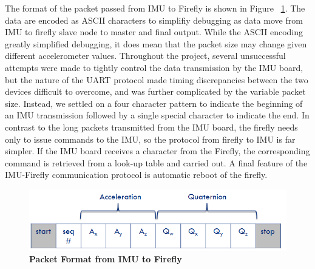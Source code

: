 \documentclass[conference]{IEEEtran}
\begin{document}
  The format of the packet passed from IMU to Firefly is shown in
Figure ~\ref{fig:packet}. The data are encoded as ASCII characters to simplifiy debugging
as data move from IMU to firefly slave node to master and final output. While the ASCII
encoding greatly simplified debugging, it does mean that the packet size may change given
different accelerometer values.  Throughout the project, several unsuccessful attempts
were made to tightly control the data transmission by the IMU board, but the nature of the
UART protocol made timing discrepancies between the two devices difficult to overcome, and
was further complicated by the variable packet size. Instead, we settled on a four
character pattern to indicate the beginning of an IMU transmission followed by a single
special character to indicate the end. In contrast to the long packets transmitted from
the IMU board, the firefly needs only to issue commands to the IMU, so the protocol from
firefly to IMU is far simpler. If the IMU board receives a character from the Firefly, the
corresponding command is retrieved from a look-up table and carried out. A final feature
of the IMU-Firefly communication protocol is automatic reboot of the firefly. 

\begin{figure}[h]
  \centering
  \includegraphics[width=0.8\columnwidth]{figs/packet}
  \caption{{\bf Packet Format from IMU to Firefly}}
  \label{fig:packet}
\end{figure}
\end{document}
